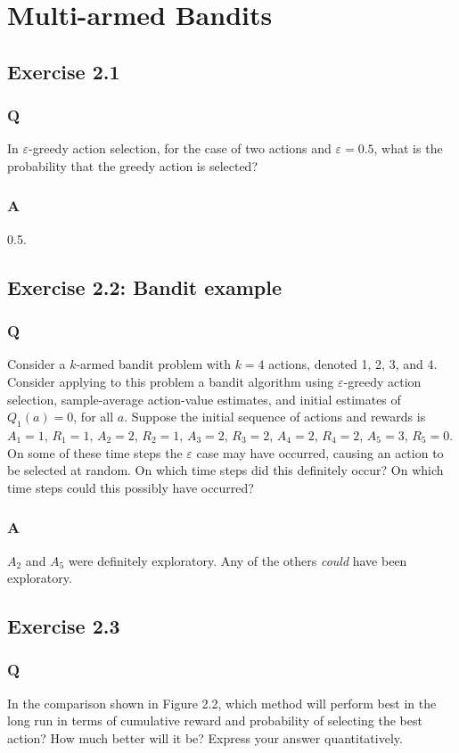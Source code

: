\clearpage
\section{Multi-armed Bandits}
\subsection{Exercise 2.1}
\subsubsection{Q}
In $\varepsilon$-greedy action selection, for the case of two actions and $\varepsilon = 0.5$, what is the probability that the greedy action is selected?

\subsubsection{A}
0.5.


\subsection{Exercise 2.2: Bandit example}
\subsubsection{Q}
Consider a $k$-armed bandit problem with $k = 4$ actions, denoted 1, 2, 3, and 4. Consider applying to this problem a bandit algorithm using $\varepsilon$-greedy action selection, sample-average action-value estimates, and initial estimates of $Q_1(a) = 0$, for all $a$. Suppose the initial sequence of actions and rewards is $A_1 = 1$, $R_1 =1$, $A_2 =2$, $R_2 =1$, $A_3 =2$, $R_3 =2$, $A_4 =2$, $R_4 =2$, $A_5 =3$, $R_5 =0$. On some of these time steps the $\varepsilon$ case may have occurred, causing an action to be selected at random. On which time steps did this definitely occur? On which time steps could this possibly have occurred?

\subsubsection{A}
$A_2$ and $A_5$ were definitely exploratory. Any of the others \emph{could} have been exploratory.


\subsection{Exercise 2.3}
\subsubsection{Q}
In the comparison shown in Figure 2.2, which method will perform best in the long run in terms of cumulative reward and probability of selecting the best action? How much better will it be? Express your answer quantitatively.

